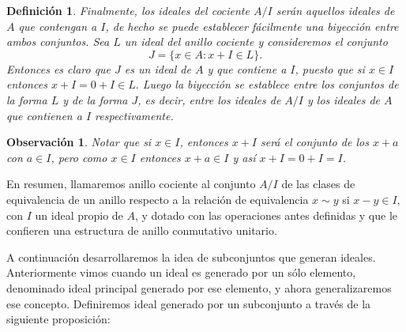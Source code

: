 \documentclass[12pt]{article}
\newtheorem{definition}[theorem]{Definición}
\newtheorem{observation}{Observación}[theorem]
\begin{document}
\begin{definition}
Finalmente, los ideales del cociente $A/I$ serán aquellos ideales de $A$ que contengan a $I$, de hecho se puede establecer fácilmente una biyección entre ambos conjuntos. Sea $L$ un ideal del anillo cociente y consideremos el conjunto $$J = \lbrace x \in A : x + I \in L \rbrace.$$ Entonces es claro que $J$ es un ideal de $A$ y que contiene a $I$, puesto que si $x \in I$ entonces $x + I = 0 + I \in L.$ Luego la biyección se establece entre los conjuntos de la forma $L$ y de la forma $J$, es decir, entre los ideales de $A/I$ y los ideales de $A$ que contienen a $I$ respectivamente.
\end{definition}

\begin{observation} Notar que si $x \in I$, entonces $x + I$ será el conjunto de los $x+a$ con $a \in I$, pero como $x \in I$ entonces $x+a \in I$ y así $x + I = 0 + I = I$.
\end{observation}

En resumen, llamaremos anillo cociente al conjunto $A/I$ de las clases de equivalencia de un anillo respecto a la relación de equivalencia $x \sim y$ si $x-y \in I$, con $I$ un ideal propio de $A$, y dotado con las operaciones antes definidas y que le confieren una estructura de anillo conmutativo unitario.

A continuación desarrollaremos la idea de subconjuntos que generan ideales. Anteriormente vimos cuando un ideal es generado por un sólo elemento, denominado ideal principal generado por ese elemento, y ahora generalizaremos ese concepto. Definiremos ideal generado por un subconjunto a través de la siguiente proposición:
\end{document}
